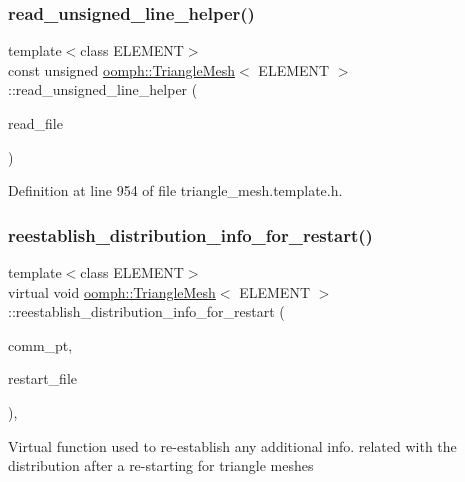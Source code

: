 \subsubsection{\texorpdfstring{read\+\_\+unsigned\+\_\+line\+\_\+helper()}{read\_unsigned\_line\_helper()}}
{\footnotesize\ttfamily template$<$class E\+L\+E\+M\+E\+NT$>$ \\
const unsigned \hyperlink{classoomph_1_1TriangleMesh}{oomph\+::\+Triangle\+Mesh}$<$ E\+L\+E\+M\+E\+NT $>$\+::read\+\_\+unsigned\+\_\+line\+\_\+helper (\begin{DoxyParamCaption}\item[{std\+::istream \&}]{read\+\_\+file }\end{DoxyParamCaption})\hspace{0.3cm}{\ttfamily [inline]}}



Definition at line 954 of file triangle\+\_\+mesh.\+template.\+h.

\mbox{\label{classoomph_1_1TriangleMesh_aa4b1cfd4537c1e511fe1f2fb14b1e8a6}} 
\subsubsection{\texorpdfstring{reestablish\+\_\+distribution\+\_\+info\+\_\+for\+\_\+restart()}{reestablish\_distribution\_info\_for\_restart()}}
{\footnotesize\ttfamily template$<$class E\+L\+E\+M\+E\+NT$>$ \\
virtual void \hyperlink{classoomph_1_1TriangleMesh}{oomph\+::\+Triangle\+Mesh}$<$ E\+L\+E\+M\+E\+NT $>$\+::reestablish\+\_\+distribution\+\_\+info\+\_\+for\+\_\+restart (\begin{DoxyParamCaption}\item[{Oomph\+Communicator $\ast$}]{comm\+\_\+pt,  }\item[{std\+::istream \&}]{restart\+\_\+file }\end{DoxyParamCaption})\hspace{0.3cm}{\ttfamily [inline]}, {\ttfamily [virtual]}}

Virtual function used to re-\/establish any additional info. related with the distribution after a re-\/starting for triangle meshes 

